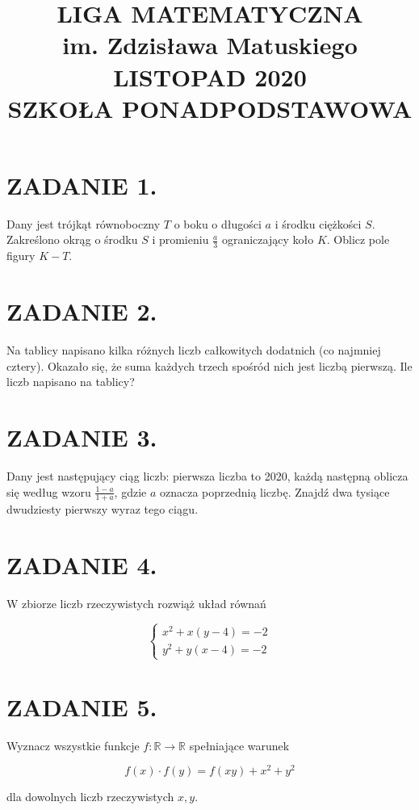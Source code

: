 \documentclass[10pt]{article}
\title{LIGA MATEMATYCZNA \\
 im. Zdzisława Matuskiego \\
 LISTOPAD 2020 \\
 SZKOŁA PONADPODSTAWOWA }
\author{}
\date{}
\begin{document}
\maketitle
\section*{ZADANIE 1.}
Dany jest trójkąt równoboczny \(T\) o boku o długości \(a\) i środku ciężkości \(S\). Zakreślono okrąg o środku \(S\) i promieniu \(\frac{a}{3}\) ograniczający koło \(K\). Oblicz pole figury \(K-T\).

\section*{ZADANIE 2.}
Na tablicy napisano kilka różnych liczb całkowitych dodatnich (co najmniej cztery). Okazało się, że suma każdych trzech spośród nich jest liczbą pierwszą. Ile liczb napisano na tablicy?

\section*{ZADANIE 3.}
Dany jest następujący ciąg liczb: pierwsza liczba to 2020, każdą następną oblicza się według wzoru \(\frac{1-a}{1+a}\), gdzie \(a\) oznacza poprzednią liczbę. Znajdź dwa tysiące dwudziesty pierwszy wyraz tego ciągu.

\section*{ZADANIE 4.}
W zbiorze liczb rzeczywistych rozwiąż układ równań

\[
\left\{\begin{array}{l}
x^{2}+x(y-4)=-2 \\
y^{2}+y(x-4)=-2
\end{array}\right.
\]

\section*{ZADANIE 5.}
Wyznacz wszystkie funkcje \(f: \mathbb{R} \rightarrow \mathbb{R}\) spełniające warunek

\[
f(x) \cdot f(y)=f(x y)+x^{2}+y^{2}
\]

dla dowolnych liczb rzeczywistych \(x, y\).
\end{document}
